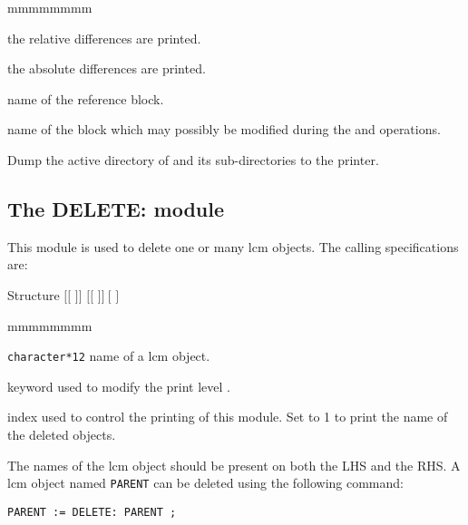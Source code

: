 \begin{ListeDeDescription}{mmmmmmmm}
\item[\moc{REL}] the relative differences are printed.

\item[\moc{ABS}] the absolute differences are printed.

\item[\dusa{NOMREF}] name of the reference block.

\item[\dusa{NOMALT}] name of the block which may possibly be modified during
the  and  operations.

\item[\moc{DUMP}] Dump the active directory of and its
sub-directories to the printer.

\end{ListeDeDescription}

\clearpage

\subsection{The DELETE: module}\label{sect:DELETEData}

This module is used to delete one or many {\sc lcm} objects. The calling
specifications are:

\begin{DataStructure}{Structure }
$[[$  $]]$ \moc{:=}  $[[$  $]]~[$ \moc{::}   $]$ \moc{;}
\end{DataStructure}

\begin{ListeDeDescription}{mmmmmmmm}

\item[\dusa{NAME1}] {\tt character*12} name of a {\sc lcm} object.

\item[\moc{EDIT}] keyword used to modify the print level .

\item[\dusa{iprint}] index used to control the printing of this module. Set to 1 to
print the name of the deleted objects.

\end{ListeDeDescription}

The names of the {\sc lcm} object should be present on both the LHS and
the RHS. A {\sc lcm} object named {\tt PARENT} can be deleted using the following command:

\begin{verbatim}
PARENT := DELETE: PARENT ;
\end{verbatim}

